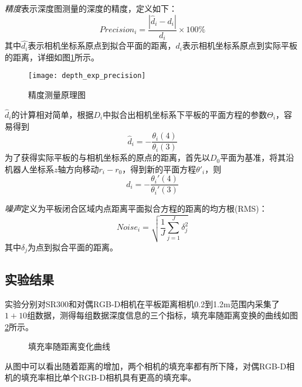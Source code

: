\emph{精度}表示深度图测量的深度的精度，定义如下：
\begin{equation}
  Precision_i = \frac{|\hat{d}_i-d_i|}{d_i} \times 100\%
\end{equation}
其中$\hat{d_i}$表示相机坐标系原点到拟合平面的距离，$d_i$表示相机坐标系原点到实际平板的距离，详细如图\ref{fig:depth_exp_precision}所示。
\begin{figure}
  \centering
  \texttt{[image: depth\_exp\_precision]}
  \caption{精度测量原理图}
  \label{fig:depth_exp_precision}
\end{figure}
$\hat{d}_i$的计算相对简单，根据$D_i$中拟合出相机坐标系下平板的平面方程的参数$\Theta_i$，容易得到
\begin{equation}
  \hat{d}_i = -\frac{\theta_i(4)}{\theta_i(3)}
\end{equation}
为了获得实际平板的与相机坐标系的原点的距离，首先以$D_0$平面为基准，将其沿机器人坐标系$z$轴方向移动$r_i-r_0$，得到新的平面方程$\theta'_i$，则
\begin{equation}
  d_i = -\frac{\theta_i'(4)}{\theta_i'(3)}
\end{equation}

\emph{噪声}定义为平板闭合区域内点距离平面拟合方程的距离的均方根(RMS)：
\begin{equation}
  Noise_i = \sqrt{\frac{1}{J}\sum_{j=1}^J{\delta_j^2}}
\end{equation}
其中$\delta_j$为点到拟合平面的距离。

\subsection{实验结果}
实验分别对SR300和对偶RGB-D相机在平板距离相机0.2到1.2m范围内采集了$1 + 10$组数据，测得每组数据深度信息的三个指标，填充率随距离变换的曲线如图\ref{fig:fillrate}所示。
\begin{figure}[ht]
  \centering
  \caption{填充率随距离变化曲线}
  \label{fig:fillrate}
\end{figure}
从图中可以看出随着距离的增加，两个相机的填充率都有所下降，对偶RGB-D相机的填充率相比单个RGB-D相机具有更高的填充率。


